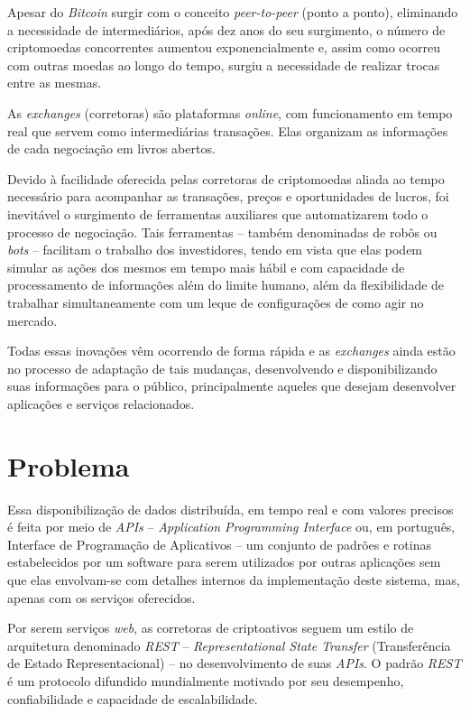 Apesar do \textit{Bitcoin} surgir com o conceito \textit{peer-to-peer} (ponto a ponto), eliminando a necessidade de intermediários, após dez anos do seu surgimento, o número de criptomoedas concorrentes aumentou exponencialmente e, assim como ocorreu com outras moedas ao longo do tempo, surgiu a necessidade de realizar trocas entre as mesmas.

As \textit{exchanges} (corretoras) são plataformas \textit{online}, com funcionamento em tempo real que servem como intermediárias transações. Elas organizam as informações de cada negociação em livros abertos.

Devido à facilidade oferecida pelas corretoras de criptomoedas aliada ao tempo necessário para acompanhar as transações, preços e oportunidades de lucros, foi inevitável o surgimento de ferramentas auxiliares que automatizarem todo o processo de negociação. Tais ferramentas – também denominadas de robôs ou \textit{bots} – facilitam o trabalho dos investidores, tendo em vista que elas podem simular as ações dos mesmos em tempo mais hábil e com capacidade de processamento de informações além do limite humano, além da flexibilidade de trabalhar simultaneamente com um leque de configurações de como agir no mercado.

Todas essas inovações vêm ocorrendo de forma rápida e as \textit{exchanges} ainda estão no processo de adaptação de tais mudanças, desenvolvendo e disponibilizando suas informações para o público, principalmente aqueles que desejam desenvolver aplicações e serviços relacionados. 

\section{Problema}

Essa disponibilização de dados distribuída, em tempo real e com valores precisos é feita por meio de \textit{APIs} – \textit{Application Programming Interface} ou, em português, Interface de Programação de Aplicativos – um conjunto de padrões e rotinas estabelecidos por um software para serem utilizados por outras aplicações sem que elas envolvam-se com detalhes internos da implementação deste sistema, mas, apenas com os serviços oferecidos.

Por serem serviços \textit{web}, as corretoras de criptoativos seguem um estilo de arquitetura denominado \textit{REST} – \textit{Representational State Transfer} (Transferência de Estado Representacional) – no desenvolvimento de suas \textit{APIs}. O padrão \textit{REST} é um protocolo difundido mundialmente motivado por seu desempenho, confiabilidade e capacidade de escalabilidade.

